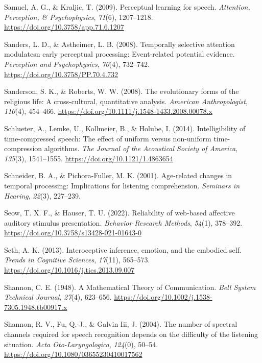 \documentclass[a4paper, nobind]{templates/ociamthesis}
\newlength{\cslhangindent}
\newenvironment{CSLReferences}[2] %
 {%
  \setlength{\parindent}{0pt}
  \ifodd #1
  \let\oldpar\par
  \def\par{\hangindent=\cslhangindent\oldpar}
  \fi
  \setlength{\parskip}{1mm}
  \setlength{\baselineskip}{6mm}
 }%
 {}
\begin{document}
\begin{CSLReferences}{1}{0}
\leavevmode{}%
Samuel, A. G., \& Kraljic, T. (2009). Perceptual learning for speech. \emph{Attention, Perception, \& Psychophysics}, \emph{71}(6), 1207--1218. \url{https://doi.org/10.3758/app.71.6.1207}

\leavevmode{}%
Sanders, L. D., \& Astheimer, L. B. (2008). {Temporally selective attention modulatesn early perceptual processing: Event-related potential evidence}. \emph{Perception and Psychophysics}, \emph{70}(4), 732--742. \url{https://doi.org/10.3758/PP.70.4.732}

\leavevmode{}%
Sanderson, S. K., \& Roberts, W. W. (2008). {The evolutionary forms of the religious life: A cross-cultural, quantitative analysis}. \emph{American Anthropologist}, \emph{110}(4), 454--466. \url{https://doi.org/10.1111/j.1548-1433.2008.00078.x}

\leavevmode{}%
Schlueter, A., Lemke, U., Kollmeier, B., \& Holube, I. (2014). {Intelligibility of time-compressed speech: The effect of uniform versus non-uniform time-compression algorithms}. \emph{The Journal of the Acoustical Society of America}, \emph{135}(3), 1541--1555. \url{https://doi.org/10.1121/1.4863654}

\leavevmode{}%
Schneider, B. A., \& Pichora-Fuller, M. K. (2001). Age-related changes in temporal processing: Implications for listening comprehension. \emph{Seminars in Hearing}, \emph{22}(3), 227--239.

\leavevmode{}%
Seow, T. X. F., \& Hauser, T. U. (2022). {Reliability of web-based affective auditory stimulus presentation}. \emph{Behavior Research Methods}, \emph{54}(1), 378--392. \url{https://doi.org/10.3758/s13428-021-01643-0}

\leavevmode{}%
Seth, A. K. (2013). Interoceptive inference, emotion, and the embodied self. \emph{Trends in Cognitive Sciences}, \emph{17}(11), 565--573. \url{https://doi.org/10.1016/j.tics.2013.09.007}

\leavevmode{}%
Shannon, C. E. (1948). A Mathematical Theory of Communication. \emph{Bell System Technical Journal}, \emph{27}(4), 623--656. \url{https://doi.org/10.1002/j.1538-7305.1948.tb00917.x}

\leavevmode{}%
Shannon, R. V., Fu, Q.-J., \& Galvin Iii, J. (2004). {The number of spectral channels required for speech recognition depends on the difficulty of the listening situation}. \emph{Acta Oto-Laryngologica}, \emph{124}(0), 50--54. \url{https://doi.org/10.1080/03655230410017562}


\end{CSLReferences}
\end{document}

